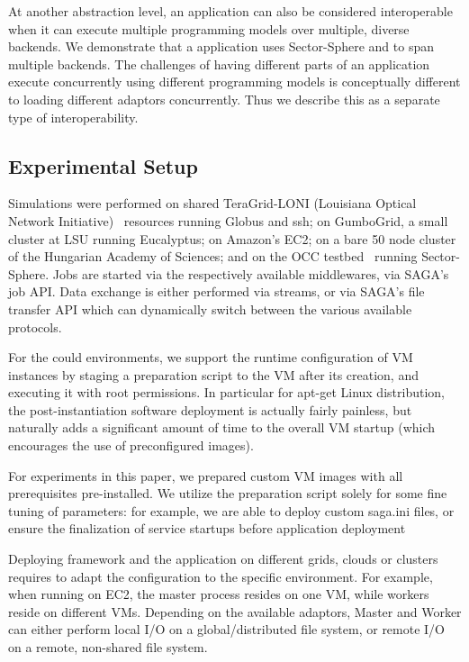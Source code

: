 \documentclass[3p,twocolumn]{elsarticle}
\begin{document}
At another abstraction level, an application can also be considered
interoperable when it can  execute multiple
programming models over multiple, diverse backends.  We demonstrate
that a \wc application uses Sector-Sphere and \smr to span multiple
backends.  The challenges of having different parts of an application
execute concurrently using different programming models is
conceptually different to loading different adaptors
concurrently. Thus we describe this as a separate type of
interoperability.

\subsection{Experimental Setup}

Simulations were performed on shared TeraGrid-LONI (Louisiana Optical
Network Initiative)~\cite{loni-url} resources running Globus and ssh;
on GumboGrid, a small cluster at LSU running Eucalyptus; on Amazon's
EC2; on a bare 50 node cluster of the Hungarian Academy of Sciences;
and on the OCC testbed~\cite{occ_testbed} running Sector-Sphere.  Jobs
are started via the respectively available middlewares, via SAGA's job
API.  Data exchange is either performed via streams, or via SAGA's
file transfer API which can dynamically switch between the various
available protocols.

For the could environments, we support the runtime configuration of VM
instances by staging a preparation script to the VM after its
creation, and executing it with root permissions.  In particular for
apt-get Linux distribution, the post-instantiation software deployment
is actually fairly painless, but naturally adds a significant amount
of time to the overall VM startup (which encourages the use of
preconfigured images).

For experiments in this paper, we prepared custom VM images with all
prerequisites pre-installed.  We utilize the preparation script solely
for some fine tuning of parameters: for example, we are able to deploy
custom saga.ini files, or ensure the finalization of service startups
before application deployment

Deploying \sagamapreduce framework and the \wc application on
different grids, clouds or clusters requires to adapt the configuration
to the specific environment.  For example, when running \sagamapreduce
on EC2, the master process resides on one VM, while workers reside on
different VMs.  Depending on the available adaptors, Master and Worker
can either perform local I/O on a global/distributed file system, or
remote I/O on a remote, non-shared file system.
\end{document}
